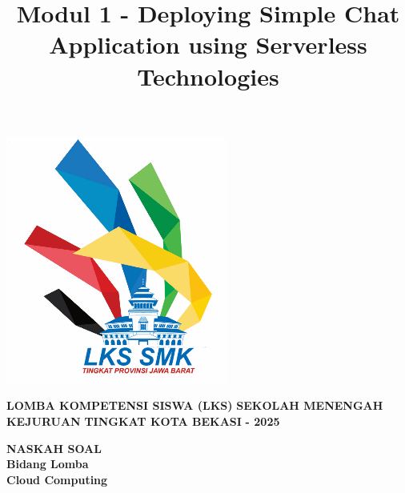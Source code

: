 \documentclass{article}
\title{Modul 1 - Deploying Simple Chat Application using Serverless Technologies}
\author{}
\begin{document}
\lstset{language=C,upquote=true}
\begin{minipage}{0.2\textwidth}
  \includegraphics[width=\linewidth]{assets/logo_lks.png}
\end{minipage}
\hfill%
\begin{minipage}{0.75\textwidth}
  {\selectfont
    {\huge
    \textbf{LOMBA KOMPETENSI SISWA (LKS)}
    \vspace{2mm} 
    \textbf{SEKOLAH MENENGAH KEJURUAN}
    \textbf{TINGKAT KOTA BEKASI}
    \textbf{- 2025}
    }
  }
\end{minipage}
\vspace{30mm} %
\begin{center}
  {\selectfont
    {\huge
      \textbf{NASKAH SOAL}\\
      \vspace{10mm} 
      \textbf{Bidang Lomba}\\
      \vspace{4mm} 
      \textbf{Cloud Computing}
    }
  }
\end{center}
{\let\newpage\relax\maketitle}
\newpage
\end{document}
